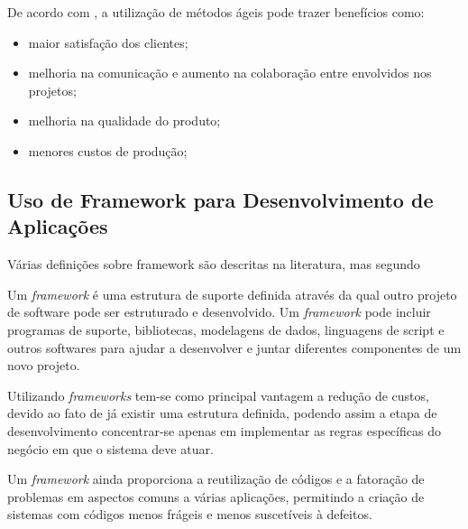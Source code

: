 De acordo com \cite{pressman2016engenharia}, a utilização de métodos ágeis pode trazer benefícios como: 
\begin{itemize}
    \item maior satisfação dos clientes;
    \item melhoria na comunicação e aumento na colaboração entre envolvidos nos projetos;
    \item melhoria na qualidade do produto;
    \item menores custos de produção;
\end{itemize} 

\subsection{Uso de Framework para Desenvolvimento de Aplicações}

Várias definições sobre framework são descritas na literatura, mas segundo \cite{gammapadroes} 

Um \textit{framework} é uma estrutura de suporte definida através da qual outro projeto de software pode ser estruturado e desenvolvido. Um
\textit{framework} pode incluir programas de suporte, bibliotecas, modelagens de dados, linguagens de script e outros softwares para ajudar a desenvolver e juntar diferentes componentes de um novo projeto. 

Utilizando \textit{frameworks} tem-se como principal vantagem a redução de custos, devido ao fato de já existir uma estrutura definida, podendo assim a etapa de desenvolvimento concentrar-se apenas em implementar as regras específicas do negócio em que o sistema deve atuar. 

Um \textit{framework} ainda proporciona a reutilização de códigos e a fatoração de problemas em aspectos comuns a várias aplicações, permitindo a criação de sistemas com códigos menos frágeis e menos suscetíveis à defeitos. 